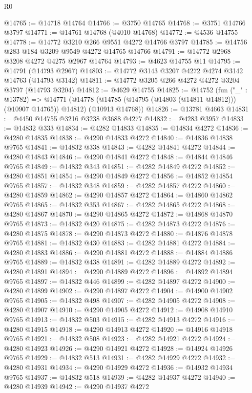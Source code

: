 \begin{lexlean}{R0}
\begin{coremodule}
@14765 := @14718 @14764
@14766 := @3750 @14765
@14768 := @3751 @14766 @3797
@14771 := @14761 @14768 (@4010 @14768)
@14772 := @4536 @14755
@14778 := @14772 @3210 @266 @9551 @4272 @14766 @3797
@14785 := @14756 @283 @184 @3209 @9549 @4272 @14765 @14766
@14791 := @14772 @2968 @3208 @4272 @4275 @2967 @14764
@14793 := @4623 @14755 @11
@14795 := @14791 (@14793 @2967)
@14803 := @14772 @3143 @3207 @4272 @4274 @3142 @14763 (@14793 @3142)
@14811 := @14772 @3205 @266 @4272 @4272 @3204 @3797 (@14793 @3204)
@14812 := @4629 @14755
@14825 := @14752
    (fun ("_" : @13782) =>
    @14771
      (@14778 (@14785 (@14795 (@14803 (@14811 @14812))) (@10907 @14765)) @14812)
      (@10913 @14768))
@14826 := @13781 @4663
@14831 := @4450 @14755 @3216 @3238 @3688 @4277
@14832 := @4283 @3957
@14833 := @14832 @333
@14834 := @4282 @14833
@14835 := @14834 @4272
@14836 := @4280 @14835
@14838 := @4290 @14833 @4272
@14840 := @14836 @14838 @9765
@14841 := @14832 @338
@14843 := @4282 @14841 @4272
@14844 := @4280 @14843
@14846 := @4290 @14841 @4272
@14848 := @14844 @14846 @9765
@14849 := @14832 @343
@14851 := @4282 @14849 @4272
@14852 := @4280 @14851
@14854 := @4290 @14849 @4272
@14856 := @14852 @14854 @9765
@14857 := @14832 @348
@14859 := @4282 @14857 @4272
@14860 := @4280 @14859
@14862 := @4290 @14857 @4272
@14864 := @14860 @14862 @9765
@14865 := @14832 @353
@14867 := @4282 @14865 @4272
@14868 := @4280 @14867
@14870 := @4290 @14865 @4272
@14872 := @14868 @14870 @9765
@14873 := @14832 @420
@14875 := @4282 @14873 @4272
@14876 := @4280 @14875
@14878 := @4290 @14873 @4272
@14880 := @14876 @14878 @9765
@14881 := @14832 @430
@14883 := @4282 @14881 @4272
@14884 := @4280 @14883
@14886 := @4290 @14881 @4272
@14888 := @14884 @14886 @9765
@14889 := @14832 @438
@14891 := @4282 @14889 @4272
@14892 := @4280 @14891
@14894 := @4290 @14889 @4272
@14896 := @14892 @14894 @9765
@14897 := @14832 @446
@14899 := @4282 @14897 @4272
@14900 := @4280 @14899
@14902 := @4290 @14897 @4272
@14904 := @14900 @14902 @9765
@14905 := @14832 @498
@14907 := @4282 @14905 @4272
@14908 := @4280 @14907
@14910 := @4290 @14905 @4272
@14912 := @14908 @14910 @9765
@14913 := @14832 @503
@14915 := @4282 @14913 @4272
@14916 := @4280 @14915
@14918 := @4290 @14913 @4272
@14920 := @14916 @14918 @9765
@14921 := @14832 @508
@14923 := @4282 @14921 @4272
@14924 := @4280 @14923
@14926 := @4290 @14921 @4272
@14928 := @14924 @14926 @9765
@14929 := @14832 @513
@14931 := @4282 @14929 @4272
@14932 := @4280 @14931
@14934 := @4290 @14929 @4272
@14936 := @14932 @14934 @9765
@14937 := @14832 @518
@14939 := @4282 @14937 @4272
@14940 := @4280 @14939
@14942 := @4290 @14937 @4272

\end{coremodule}
\end{lexlean}
